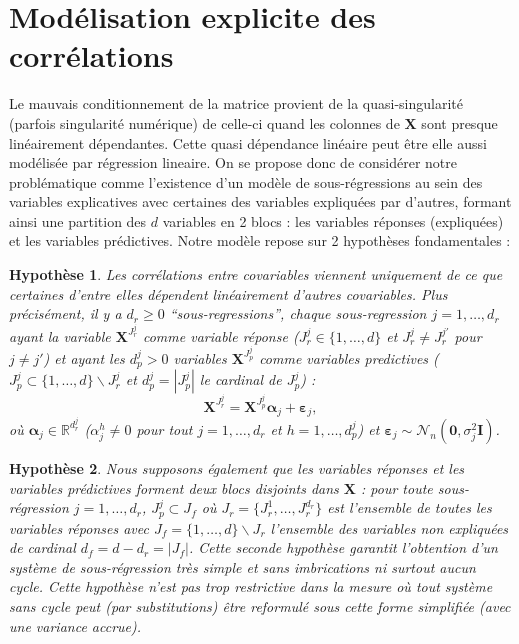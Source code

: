 \documentclass[12pt,a4paper]{report}
\newtheorem{hypfr}{Hypothèse}
\begin{document}
	\section{Modélisation explicite des corrélations}
	Le mauvais conditionnement de la matrice provient de la quasi-singularité (parfois singularité numérique) de celle-ci quand les colonnes de $\boldsymbol{X}$ sont presque linéairement dépendantes. Cette quasi dépendance linéaire peut être elle aussi modélisée par régression lineaire. On se propose donc de considérer notre problématique comme l'existence d'un modèle de sous-régressions au sein des variables explicatives avec certaines des variables expliquées par d'autres, formant ainsi une partition des $d$ variables en 2 blocs : les variables réponses (expliquées) et les variables prédictives. Notre modèle repose sur 2 hypothèses fondamentales :
	

\begin{hypfr}\label{H1fr}
Les corrélations entre covariables viennent uniquement de ce que certaines d'entre elles dépendent linéairement d'autres covariables. Plus précisément, il y a $d_{r}\geq 0$  ``sous-regressions'', chaque sous-regression $j=1,\ldots,d_{r}$ ayant la variable $\boldsymbol{X}^{J_{r}^j}$ comme variable {\it réponse} ($J_{r}^j\in\{1,\ldots,d\}$ et $J_{r}^j\neq J_{r}^{j'}$ pour $j\neq j'$) et ayant les $d_p^j>0$ variables $\boldsymbol{X}^{J_{p}^j}$  comme variables {\it predictives}  ($J_{p}^j\subset\{1,\ldots,d\} \backslash J_{r}^j$ et $d_p^j=|J_{p}^j|$ le cardinal de $J_{p}^j$) :
\begin{equation}
\boldsymbol{X}^{J_{r}^j}%
=\boldsymbol{X}^{J_{p}^j}\boldsymbol{\alpha}_j+\boldsymbol{\varepsilon}_j, \label{eq:SR_fr}
\end{equation}
où $\boldsymbol{\alpha}_j\in{\mathbb{R}^{d_r^j}}$ (${\alpha}_j^h\neq 0$ pour tout $j=1,\ldots,d_r$ et $h=1,\ldots,d_p^j$) et $\boldsymbol{\varepsilon}_j \sim\mathcal{N}_n(\boldsymbol{0},\sigma^2_j\boldsymbol{I})$.
\end{hypfr}

\begin{hypfr}\label{H2fr}
Nous supposons également que les variables réponses et les variables prédictives forment deux blocs disjoints dans $\boldsymbol{X}$ :
 pour toute sous-régression $j=1,\ldots,d_{r}$, $J_{p}^j\subset J_f$ où $J_{r}=\{J_{r}^1,\ldots,J_{r}^{d_r}\}$ est l'ensemble de toutes les variables réponses avec $J_f=\{1,\ldots,d\} \backslash J_{r}$ l'ensemble des variables non expliquées de cardinal $d_f=d-d_r=|J_f|$. Cette seconde hypothèse garantit l'obtention d'un système de sous-régression très simple et sans imbrications ni surtout aucun cycle. Cette hypothèse n'est pas trop restrictive dans la mesure où tout système sans cycle peut (par substitutions) être reformulé sous cette forme simplifiée (avec une variance accrue).
\end{hypfr}
\end{document}

